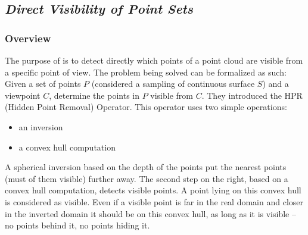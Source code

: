 \subsection{\emph{Direct Visibility of Point Sets}}
\label{subsc:direct}

\subsubsection{Overview}
The purpose of \cite{vis1} is to detect directly which points of a point cloud are visible from a specific point of view. The problem being solved can be formalized as such: Given a set of points $P$ (considered a sampling of continuous surface $S$) and a viewpoint $C$, determine the points in $P$ visible from $C$. They introduced the HPR (Hidden Point Removal) Operator. This operator uses two simple operations:

\begin{itemize}
  \item an inversion
  \item a convex hull computation
\end{itemize}

A spherical inversion based on the depth of the points put the nearest points (must of them visible) further away. The second step on the right, based on a convex hull computation, detects visible points. A point lying on this convex hull is considered as visible. Even if a visible point is far in the real domain and closer in the inverted domain it should be on this convex hull, as long as it is visible -- no points behind it, no points hiding it.


